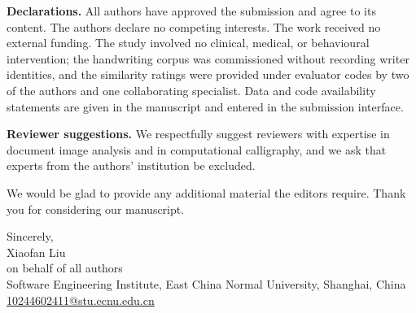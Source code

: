 \documentclass[11pt,a4paper]{article}
\begin{document}
\textbf{Declarations.} All authors have approved the submission and agree to
its content. The authors declare no competing interests. The work received no
external funding. The study involved no clinical, medical, or behavioural
intervention; the handwriting corpus was commissioned without recording
writer identities, and the similarity ratings were provided under evaluator
codes by two of the authors and one collaborating specialist. Data and code
availability statements are given in the manuscript and entered in the
submission interface.

\textbf{Reviewer suggestions.} We respectfully suggest reviewers with
expertise in document image analysis and in computational calligraphy, and we
ask that experts from the authors' institution be excluded.
%

\medskip
\noindent
We would be glad to provide any additional material the editors require.
Thank you for considering our manuscript.

\medskip
\noindent
Sincerely,\\
Xiaofan Liu\\
on behalf of all authors\\
Software Engineering Institute, East China Normal University, Shanghai, China\\
\href{mailto:10244602411@stu.ecnu.edu.cn}{10244602411@stu.ecnu.edu.cn}
\end{document}
